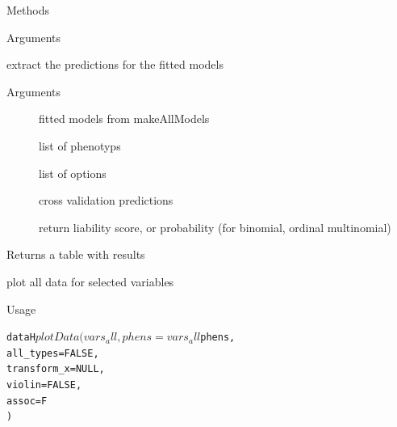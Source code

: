 \documentclass[letterpaper]{book}
\begin{document}
\begin{Section}{Methods}
\begin{SubSection}{}
\begin{SubSubSection}{Arguments}
\end{SubSubSection}

\end{SubSection}




\hypertarget{method-dataH-extractPredictions}{}
%
\begin{SubSection}{}
extract the predictions for the fitted models
%

%
\begin{SubSubSection}{Arguments}

\begin{description}

\item[] fitted models from makeAllModels
\item[] list of phenotyps
\item[] list of options
\item[] cross validation predictions
\item[] return liability score, or probability (for binomial, ordinal multinomial)

\end{description}



\end{SubSubSection}

%
\begin{SubSubSection}{Returns}
a table with results

\end{SubSubSection}

\end{SubSection}




\hypertarget{method-dataH-plotData}{}
%
\begin{SubSection}{}
plot all data for selected variables
%
\begin{SubSubSection}{Usage}

\begin{alltt}dataH$plotData(
  vars_all,
  phens = vars_all$phens,
  all_types = FALSE,
  transform_x = NULL,
  violin = FALSE,
  assoc = F
)\end{alltt}




\end{SubSubSection}
\end{SubSection}
\end{Section}
\end{document}
